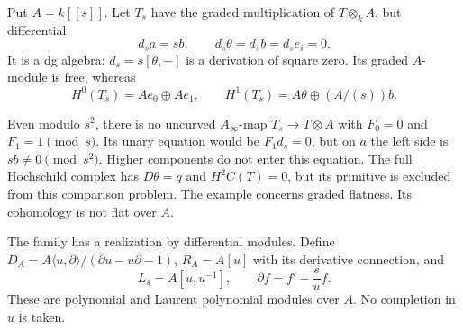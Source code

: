 Put \(A=k[[s]]\).  Let \(T_s\) have the graded multiplication of
\(T\otimes_k A\), but differential
\begin{equation}\label{cbc:rc:eq:deformation}
 d_s a=s b,\qquad d_s\theta=d_s b=d_s e_i=0.
\end{equation}
It is a dg algebra: \(d_s=s[\theta,-]\) is a derivation of square zero.
Its graded \(A\)-module is free, whereas
\[
 H^0(T_s)=Ae_0\oplus Ae_1,\qquad
 H^1(T_s)=A\theta\oplus(A/(s))b.
\]

Even modulo \(s^2\), there is no uncurved \(A_\infty\)-map
\(T_s\to T\otimes A\) with \(F_0=0\) and \(F_1=1\pmod{s}\).
Its unary equation would be \(F_1d_s=0\), but on \(a\) the left side
is \(s b\ne0\pmod{s^2}\).
Higher components do not enter this equation.
The full Hochschild complex has \(D\theta=q\) and \(H^2C(T)=0\),
but its primitive is excluded from this comparison problem.
The example concerns graded flatness. Its cohomology is not flat over
\(A\).

The family has a realization by differential modules.  Define
\(D_A=A\langle u,\partial\rangle/(\partial u-u\partial-1)\),
\(R_A=A[u]\) with its derivative connection, and
\[
 L_s=A[u,u^{-1}],\qquad \partial f=f'-\frac{s}{u}f.
\]
These are polynomial and Laurent polynomial modules over \(A\).
No completion in \(u\) is taken.

